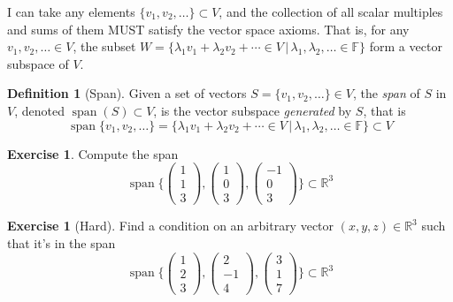 \documentclass[11pt, reqno]{amsart}
\newcommand{\op}[1]{\operatorname{#1}}
\theoremstyle{definition} %
\newtheorem{definition}[theorem]{Definition}
\newtheorem{exercise}[theorem]{Exercise}
\newcommand{\R}{\mathbb{R}}
\newcommand{\F}{\mathbb{F}}
\begin{document}
I can take any elements $\{v_1,v_2,\dots\}\subset V$, and the collection of all scalar multiples and sums of them MUST satisfy the vector space axioms. That is, for any $v_1,v_2,\dots\in V$, the subset $W=\{\lambda_1v_1+\lambda_2v_2+\cdots\in V\,|\,\lambda_1,\lambda_2,\dots\in\F\}$ form a vector subspace of $V$.

\begin{definition}[Span]
    Given a set of vectors $S=\{v_1,v_2,\dots\}\in V$, the \emph{span} of $S$ in $V$, denoted $\op{span}(S)\subset V$, is the vector subspace \emph{generated} by $S$, that is 
    \begin{equation}
        \op{span}\{v_1,v_2,\dots\}=\{\lambda_1v_1+\lambda_2v_2+\cdots\in V\,|\,\lambda_1,\lambda_2,\dots\in\F\}\subset V
    \end{equation}
\end{definition}

\begin{exercise}\label{ex1}
Compute the span
\begin{equation}
    \op{span}
    \{
    \begin{pmatrix}
        1\\
        1\\
        3
    \end{pmatrix}
    ,
    \begin{pmatrix}
        1\\
        0\\
        3
    \end{pmatrix}
    ,
    \begin{pmatrix}
        -1\\
        0\\
        3
    \end{pmatrix}
    \}
    \subset \R^3
\end{equation}
\end{exercise}

\begin{exercise}[Hard]\label{ex1} Find a condition on an arbitrary vector $(x,y,z)\in \R^3$ such that it's in the span
\begin{equation}
    \op{span}
    \{
    \begin{pmatrix}
        1\\
        2\\
        3
    \end{pmatrix}
    ,
    \begin{pmatrix}
        2\\
        -1\\
        4
    \end{pmatrix}
    ,
    \begin{pmatrix}
        3\\
        1\\
        7
    \end{pmatrix}
    \}
    \subset \R^3
\end{equation}
\end{exercise}
\end{document}
